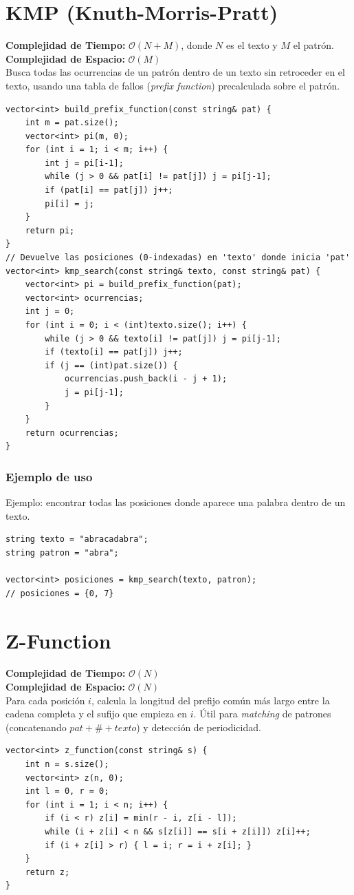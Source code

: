 \documentclass[10pt,twocolumn,letterpaper]{report}
\begin{document}
\section{KMP (Knuth-Morris-Pratt)}
\textbf{Complejidad de Tiempo:} $\mathcal{O}(N + M)$, donde $N$ es el texto y $M$ el patrón. \\
\textbf{Complejidad de Espacio:} $\mathcal{O}(M)$ \\
Busca todas las ocurrencias de un patrón dentro de un texto sin retroceder en el texto, usando una tabla de fallos (\textit{prefix function}) precalculada sobre el patrón.
\begin{lstlisting}
vector<int> build_prefix_function(const string& pat) {
    int m = pat.size();
    vector<int> pi(m, 0);
    for (int i = 1; i < m; i++) {
        int j = pi[i-1];
        while (j > 0 && pat[i] != pat[j]) j = pi[j-1];
        if (pat[i] == pat[j]) j++;
        pi[i] = j;
    }
    return pi;
}
// Devuelve las posiciones (0-indexadas) en 'texto' donde inicia 'pat'
vector<int> kmp_search(const string& texto, const string& pat) {
    vector<int> pi = build_prefix_function(pat);
    vector<int> ocurrencias;
    int j = 0;
    for (int i = 0; i < (int)texto.size(); i++) {
        while (j > 0 && texto[i] != pat[j]) j = pi[j-1];
        if (texto[i] == pat[j]) j++;
        if (j == (int)pat.size()) {
            ocurrencias.push_back(i - j + 1);
            j = pi[j-1];
        }
    }
    return ocurrencias;
}
\end{lstlisting}
\subsubsection*{Ejemplo de uso}
Ejemplo: encontrar todas las posiciones donde aparece una palabra dentro de un texto.
\begin{lstlisting}
string texto = "abracadabra";
string patron = "abra";

vector<int> posiciones = kmp_search(texto, patron);
// posiciones = {0, 7}
\end{lstlisting}

\section{Z-Function}
\textbf{Complejidad de Tiempo:} $\mathcal{O}(N)$ \\
\textbf{Complejidad de Espacio:} $\mathcal{O}(N)$ \\
Para cada posición $i$, calcula la longitud del prefijo común más largo entre la cadena completa y el sufijo que empieza en $i$. Útil para \textit{matching} de patrones (concatenando $pat + \# + texto$) y detección de periodicidad.
\begin{lstlisting}
vector<int> z_function(const string& s) {
    int n = s.size();
    vector<int> z(n, 0);
    int l = 0, r = 0;
    for (int i = 1; i < n; i++) {
        if (i < r) z[i] = min(r - i, z[i - l]);
        while (i + z[i] < n && s[z[i]] == s[i + z[i]]) z[i]++;
        if (i + z[i] > r) { l = i; r = i + z[i]; }
    }
    return z;
}
\end{lstlisting}
\end{document}
